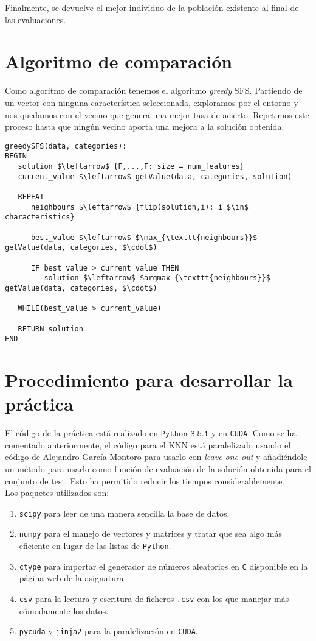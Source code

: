 \documentclass[11pt,leqno]{article}
\begin{document}
	Finalmente, se devuelve el mejor individuo de la población existente al final de las evaluaciones. 
	
\section{Algoritmo de comparación}

Como algoritmo de comparación tenemos el algoritmo \textit{greedy} SFS. Partiendo de un vector con ninguna característica seleccionada, exploramos por el entorno y nos quedamos con el vecino que genera una mejor tasa de acierto. Repetimos este proceso hasta que ningún vecino aporta una mejora a la solución obtenida.

	\begin{lstlisting}[mathescape=true]
greedySFS(data, categories):
BEGIN
   solution $\leftarrow$ {F,...,F: size = num_features}
   current_value $\leftarrow$ getValue(data, categories, solution)
   
   REPEAT
      neighbours $\leftarrow$ {flip(solution,i): i $\in$ characteristics}
   
      best_value $\leftarrow$ $\max_{\texttt{neighbours}}$ getValue(data, categories, $\cdot$)
      
      IF best_value > current_value THEN
         solution $\leftarrow$ $argmax_{\texttt{neighbours}}$ getValue(data, categories, $\cdot$)
   
   WHILE(best_value > current_value)
   
   RETURN solution
END
	\end{lstlisting}


\section{Procedimiento para desarrollar la práctica}

El código de la práctica está realizado en $\texttt{Python 3.5.1}$ y en \texttt{CUDA}. Como se ha comentado anteriormente, el código para el KNN está paralelizado usando el código de Alejandro García Montoro para usarlo con \textit{leave-one-out} y añadiéndole un método para usarlo como función de evaluación de la solución obtenida para el conjunto de test. Esto ha permitido reducir los tiempos considerablemente.\\
Los paquetes utilizados son:
\begin{enumerate}
	\item \texttt{scipy} para leer de una manera sencilla la base de datos.
	\item \texttt{numpy} para el manejo de vectores y matrices y tratar que sea algo más eficiente en lugar de las listas de \texttt{Python}.
	\item \texttt{ctype} para importar el generador de números aleatorios en \texttt{C} disponible en la página web de la asignatura. 
	\item \texttt{csv} para la lectura y escritura de ficheros \texttt{.csv} con los que manejar más cómodamente los datos.
	\item \texttt{pycuda} y \texttt{jinja2} para la paralelización en \texttt{CUDA}.
\end{enumerate}	
\end{document}

